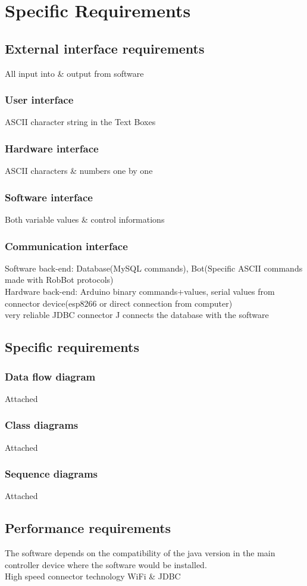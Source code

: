 \chapter{Specific Requirements}

\section{External interface requirements}
All input into \& output from software
\subsection{User interface}
ASCII character string in the Text Boxes
\subsection{Hardware interface}
ASCII characters \& numbers one by one
\subsection{Software interface}
Both variable values \& control informations
\subsection{Communication interface}
Software back-end: Database(MySQL commands), Bot(Specific ASCII commands made with RobBot protocols)
\\Hardware back-end: Arduino binary commands+values, serial values from connector device(esp8266 or direct connection from computer)
\\very reliable JDBC connector J connects the database with the software

\section{Specific requirements}
\subsection{Data flow diagram}
Attached
\subsection{Class diagrams}
Attached
\subsection{Sequence diagrams}
Attached
\section{Performance requirements}
The software depends on the compatibility of the java version in the main controller device where the software would be installed.
\\High speed connector technology WiFi \& JDBC

